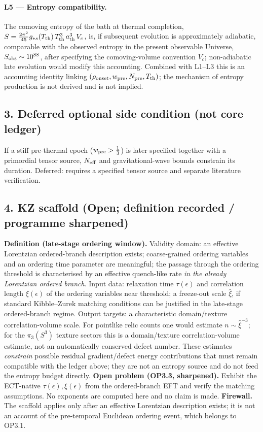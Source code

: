\paragraph{L5 --- Entropy compatibility.}
The comoving entropy of the bath at thermal completion,
$S=\tfrac{2\pi^2}{45}g_{*s}(T_{\rm th})\,T_{\rm th}^3\,
a_{\rm th}^3\,V_c$, is, if subsequent evolution is approximately adiabatic,
comparable with the observed entropy in the present observable
Universe, $S_{\rm obs}\sim10^{88}$, after specifying the
comoving-volume convention $V_c$; non-adiabatic late evolution
would modify this accounting.
Combined with L1--L3 this is an accounting identity linking
$(\rho_{\rm onset},w_{\rm pre},N_{\rm pre},T_{\rm th})$; the
mechanism of entropy production is not derived and is not implied.

\subsection*{3. Deferred optional side condition (not core
ledger)}
If a stiff pre-thermal epoch ($w_{\rm pre}>\tfrac13$) is later
specified together with a primordial tensor source, $N_{\rm eff}$
and gravitational-wave bounds constrain its duration.
Deferred: requires a specified tensor source and separate
literature verification.

\subsection*{4. KZ scaffold (Open; definition recorded /
programme sharpened)}
\textbf{Definition (late-stage ordering window).}
Validity domain: an effective Lorentzian ordered-branch
description exists; coarse-grained ordering variables and an
ordering time parameter are meaningful; the passage through the
ordering threshold is characterised by an effective quench-like
rate \emph{in the already Lorentzian ordered branch}.
Input data: relaxation time $\tau(\epsilon)$ and correlation
length $\xi(\epsilon)$ of the ordering variables near threshold;
a freeze-out scale $\hat\xi$, if standard Kibble--Zurek matching
conditions can be justified in the late-stage ordered-branch
regime.
Output targets: a characteristic domain/texture correlation-volume
scale.
For pointlike relic counts one would estimate
$n\sim\hat\xi^{-3}$; for the $\pi_3(S^3)$ texture sectors this is
a domain/texture correlation-volume estimate, not an automatically
conserved defect number.
These estimates \emph{constrain} possible residual gradient/defect
energy contributions that must remain compatible with the ledger
above; they are not an entropy source and do not feed the entropy
budget directly.
\textbf{Open problem (OP3.3, sharpened).}
Exhibit the ECT-native $\tau(\epsilon),\xi(\epsilon)$ from the
ordered-branch EFT and verify the matching assumptions.
No exponents are computed here and no claim is made.
\textbf{Firewall.}
The scaffold applies only after an effective Lorentzian
description exists; it is not an account of the pre-temporal
Euclidean ordering event, which belongs to OP3.1.

